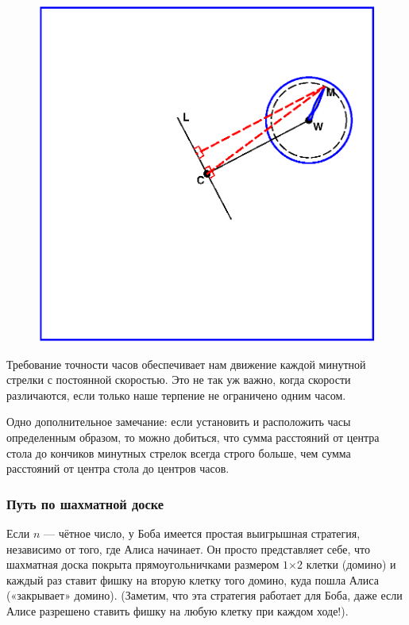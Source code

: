 \begin{figure}[h!]
\centering
\includegraphics[scale=0.6]{Figs/Insight/watch}
\end{figure}

Требование точности часов обеспечивает нам движение каждой  минутной стрелки с постоянной скоростью. Это не так уж важно, когда  скорости  различаются, если только наше терпение не ограничено одним часом.


Одно дополнительное замечание: если установить и расположить часы определенным образом,
то можно добиться, что сумма расстояний от центра стола до кончиков  минутных стрелок  всегда строго больше, чем сумма расстояний от центра стола до центров часов.\heart






\subsubsection*{Путь по шахматной доске}    %



Если $n$ --- чётное число, у Боба имеется простая выигрышная стратегия, независимо от того, где Алиса начинает.  
Он просто представляет себе, что шахматная доска покрыта прямоугольничками размером $1{\times2}$ клетки (домино) и каждый раз ставит фишку на вторую клетку того домино, куда пошла Алиса («закрывает» домино). %
(Заметим, что эта стратегия работает для Боба, даже если Алисе разрешено ставить фишку на любую клетку при каждом ходе!).


